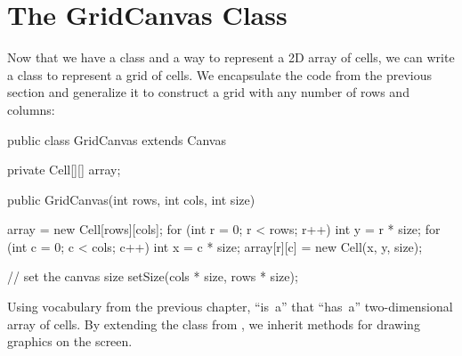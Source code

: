 %
%


\section{The GridCanvas Class}

Now that we have a  class and a way to represent a 2D array of cells, we can write a class to represent a grid of cells.
We encapsulate the code from the previous section and generalize it to construct a grid with any number of rows and columns:

\begin{code}
public class GridCanvas extends Canvas {
    private Cell[][] array;

    public GridCanvas(int rows, int cols, int size) {
        array = new Cell[rows][cols];
        for (int r = 0; r < rows; r++) {
            int y = r * size;
            for (int c = 0; c < cols; c++) {
                int x = c * size;
                array[r][c] = new Cell(x, y, size);
            }
        }

        // set the canvas size
        setSize(cols * size, rows * size);
    }
}
\end{code}


Using vocabulary from the previous chapter,  ``is~a''  that ``has~a'' two-dimensional array of cells.
By extending the  class from , we inherit methods for drawing graphics on the screen.

